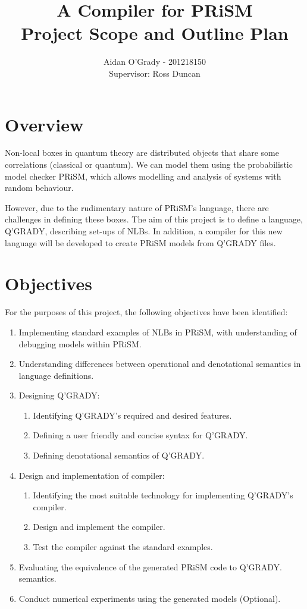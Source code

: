 \documentclass[11pt, a4paper]{article}
\begin{document}
\title{A Compiler for PRiSM \\
\large{Project Scope and Outline Plan}}
\author{Aidan O'Grady - 201218150\\Supervisor: Ross Duncan}
\date{}
\maketitle

\section{Overview} %
\label{sec:overview}
Non-local boxes in quantum theory are distributed objects that share some
correlations (classical or quantum). We can model them using the probabilistic
model checker PRiSM, which allows modelling and analysis of systems with random
behaviour.

However, due to the rudimentary nature of PRiSM's language, there are
challenges in defining these boxes. The aim of this project is to define a
language, Q'GRADY, describing set-ups of NLBs. In addition, a compiler for this
new language will be developed to create PRiSM models from Q'GRADY files.


\section{Objectives} %
\label{sec:objectives}
For the purposes of this project, the following objectives have been identified:
\begin{enumerate}
    \item Implementing standard examples of NLBs in PRiSM, with understanding of
    debugging models within PRiSM.
    \item Understanding differences between operational and denotational
    semantics in language definitions.
    \item Designing Q'GRADY:
    \begin{enumerate}
        \item Identifying Q'GRADY's required and desired features.
        \item Defining a user friendly and concise syntax for Q'GRADY.
        \item Defining denotational semantics of Q'GRADY.
    \end{enumerate}
    \item Design and implementation of compiler:
    \begin{enumerate}
        \item Identifying the most suitable technology for implementing
        Q'GRADY's compiler.
        \item Design and implement the compiler.
        \item Test the compiler against the standard examples.
    \end{enumerate}
    \item Evaluating the equivalence of the generated PRiSM code to Q'GRADY.
    semantics.
    \item Conduct numerical experiments using the generated models (Optional).
\end{enumerate}
\end{document}
